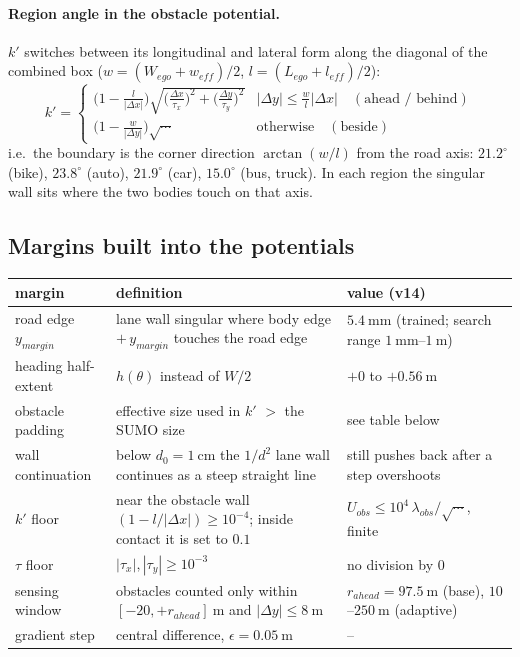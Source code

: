 \documentclass[11pt,a4paper]{article}
\begin{document}
\paragraph{Region angle in the obstacle potential.} $k'$ switches between its longitudinal and lateral form along the
diagonal of the combined box ($w = (W_{ego} + w_{eff})/2$, $l = (L_{ego} + l_{eff})/2$):
\[
  k' = \begin{cases}
    \big(1 - \tfrac{l}{|\Delta x|}\big)\sqrt{\big(\tfrac{\Delta x}{\tau_x}\big)^2 + \big(\tfrac{\Delta y}{\tau_y}\big)^2}
      & |\Delta y| \le \tfrac{w}{l}|\Delta x| \quad (\text{ahead / behind}) \\[4pt]
    \big(1 - \tfrac{w}{|\Delta y|}\big)\sqrt{\cdots} & \text{otherwise} \quad (\text{beside})
  \end{cases}
\]
i.e.\ the boundary is the corner direction $\arctan(w/l)$ from the road axis: $21.2^\circ$ (bike),
$23.8^\circ$ (auto), $21.9^\circ$ (car), $15.0^\circ$ (bus, truck). In each region the singular wall sits where the
two bodies touch on that axis.

\subsection{Margins built into the potentials}
\begin{center}
\small
\begin{tabular}{p{3.3cm}p{5.6cm}p{4.6cm}}
  \toprule
  margin & definition & value (v14) \\
  \midrule
  road edge $y_{margin}$ & lane wall singular where body edge $+ \,y_{margin}$ touches the road edge
                        & $5.4~\mathrm{mm}$ (trained; search range $1~\mathrm{mm}$--$1~\mathrm{m}$) \\
  heading half-extent   & $h(\theta)$ instead of $W/2$ & $+0$ to $+0.56~\mathrm{m}$ \\
  obstacle padding      & effective size used in $k'$ $>$ the SUMO size & see table below \\
  wall continuation     & below $d_0 = 1~\mathrm{cm}$ the $1/d^2$ lane wall continues as a steep straight line
                        & still pushes back after a step overshoots \\
  $k'$ floor            & near the obstacle wall $(1 - l/|\Delta x|) \ge 10^{-4}$; inside contact it is set to $0.1$
                        & $U_{obs} \le 10^{4}\,\lambda_{obs}/\sqrt{\cdots}$, finite \\
  $\tau$ floor          & $|\tau_x|, |\tau_y| \ge 10^{-3}$ & no division by $0$ \\
  sensing window        & obstacles counted only within $[-20, +r_{ahead}]~\mathrm{m}$ and $|\Delta y| \le 8~\mathrm{m}$
                        & $r_{ahead} = 97.5~\mathrm{m}$ (base), $10$--$250~\mathrm{m}$ (adaptive) \\
  gradient step         & central difference, $\epsilon = 0.05~\mathrm{m}$ & -- \\
  \bottomrule
\end{tabular}
\end{center}
\end{document}
